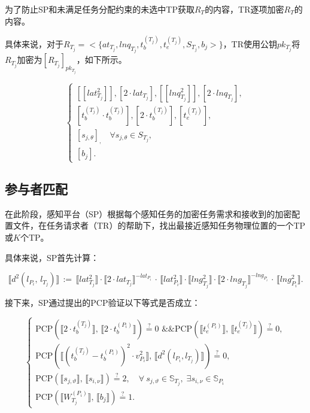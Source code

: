 为了防止SP和未满足任务分配约束的未选中TP获取\( R_{T} \)的内容，TR逐项加密\( R_{T} \)的内容。

具体来说，对于\( R_{T_j} = < \{at_{T_j}, lnq_{T_j}, t_b^{(T_j)}, t_e^{(T_j)}, S_{T_j}, b_j > \}\)，TR使用公钥\( pk_{T_j} \)将\( R_{T_j} \)加密为\([R_{T_j}]_{pk_{T_j}}\)，如下所示。

\[
\begin{cases}
[[lat_{T_j}^2]], [2 \cdot lat_{T_j}], [[lnq_{T_j}^2]], [2 \cdot lnq_{T_j}], \\
[t_b^{(T_j)} \cdot t_b^{(T_j)}], [2 \cdot t_b^{(T_j)}], [t_e^{(T_j)}], \\
[s_{j,\theta}]_, \quad \forall s_{j,\theta} \in S_{T_j}, \\
[b_j].
\end{cases}
\]

\subsection{参与者匹配} 
在此阶段，感知平台（SP）根据每个感知任务的加密任务需求和接收到的加密配置文件，在任务请求者（TR）的帮助下，找出最接近感知任务物理位置的一个TP或\(K\)个TP。

具体来说，SP首先计算：

\[
\llbracket d^{2}(l_{P_{i}},\,l_{T_{j}})\rrbracket\,:=\,\llbracket lat_{T_{j}}^{2}\rrbracket\cdot\llbracket 2\cdot lat_{T_{j}}\rrbracket^{-lat_{P_{i}}}\,\cdot\,\llbracket lat_{P_{i}}^{2}\rrbracket\cdot\llbracket lng_{T_{j}}^{2}\rrbracket\cdot \llbracket 2\cdot lng_{T_{j}}\rrbracket^{-lng_{P_{i}}}\,\cdot\,\llbracket lng_{P_{i}}^{2}\rrbracket.
\]

接下来，SP通过提出的PCP验证以下等式是否成立：

\[
\left\{\begin{array}{l}
\text{PCP}(\llbracket 2\cdot t_{b}^{(T_{j})}\rrbracket,\,\llbracket 2\cdot t_{b}^{(P_{i})}\rrbracket)\stackrel{{?}}{{=}}0\text{ \&\& PCP}(\llbracket t_{e}^{(P_{i})}\rrbracket,\,\llbracket t_{e}^{(T_{j})}\rrbracket)\stackrel{{?}}{{=}}0,\\
\text{PCP}(\llbracket(t_{b}^{(T_{j})}-t_{b}^{(P_{i})})^{2}\cdot v_{P_{i}}^{2}\rrbracket,\,\llbracket d^{2}(l_{P_{i}},l_{T_{j}})\rrbracket)\stackrel{{?}}{{=}}0,\\
\text{PCP}(\llbracket s_{j,\vartheta}\rrbracket,\,\llbracket s_{i,\nu}\rrbracket)\stackrel{{?}}{{=}}2,\quad\forall~{}s_{j,\vartheta}\in\mathbb{S}_{T_{j}},\;\exists s_{i,\nu}\in\mathbb{S}_{P_{i}}\\
\text{PCP}(\llbracket W_{T_{j}}^{(P_{i})}\rrbracket,\,\llbracket b_{j}\rrbracket)\stackrel{{?}}{{=}}1.
\end{array}\right.
\]

